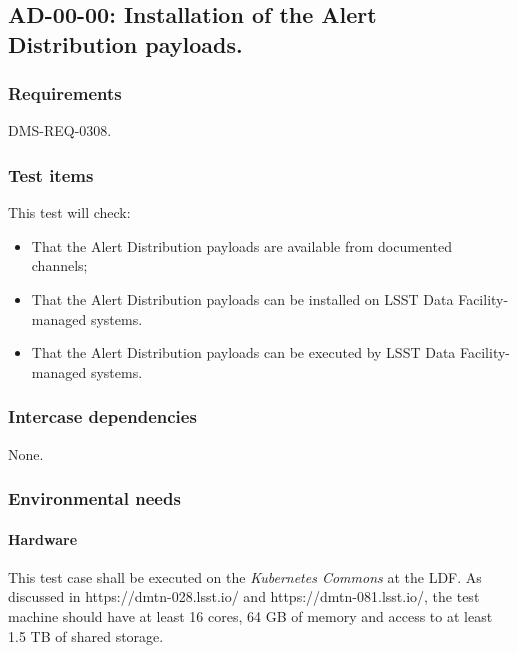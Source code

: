 \subsection{AD-00-00: Installation of the Alert Distribution payloads.}
\label{ad-00-00}

\subsubsection{Requirements}

DMS-REQ-0308.

\subsubsection{Test items}

This test will check:

\begin{itemize}

  \item{That the Alert Distribution payloads are available 
  from documented channels;}

  \item{That the Alert Distribution payloads can be installed on
  LSST Data Facility-managed systems.}

  \item{That the Alert Distribution payloads can be executed by
  LSST Data Facility-managed systems.}

\end{itemize}

\subsubsection{Intercase dependencies}

None.

\subsubsection{Environmental needs}

\paragraph{Hardware}

This test case shall be executed on the \textit{Kubernetes Commons} at the LDF. 
As discussed in https://dmtn-028.lsst.io/ and https://dmtn-081.lsst.io/, the test machine should have at least 16 cores, 64 GB of memory and access to at least 1.5 TB of shared storage.

